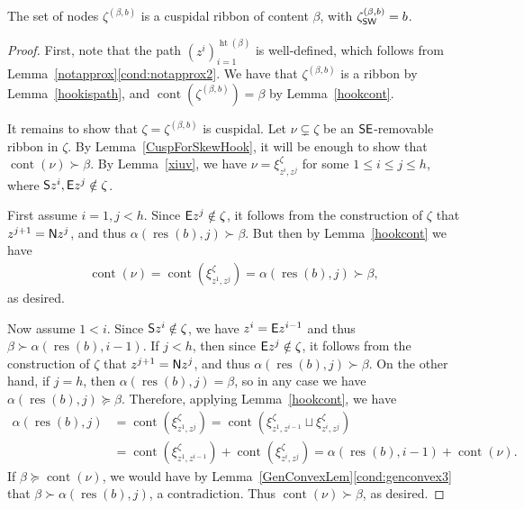 \documentclass[Unicode,ALCO]{cedram}
\newcommand{\res}{\operatorname{res}}
\newcommand{\height}{\operatorname{ht}}
\newcommand{\0}{{\bar 0}}
\newcommand{\so}{{\sf S}}
\newcommand{\no}{{\sf N}}
\newcommand{\ea}{{\sf E}}
\newcommand{\ssee}{{\sf SE}}
\newcommand{\ssww}{{\sf SW}}
\def\cont{{\operatorname{cont}}}
\def\height{{\operatorname{ht}}}
\def\height{{\operatorname{ht}}}
\begin{document}
\begin{lemma}\label{zetaiscusp}
The set of nodes  
\(\zeta^{(\beta,b)}\) is a cuspidal ribbon of content \(\beta\), with \(\zeta^{(\beta,b)}_{\ssww} = b\).
\end{lemma}
\begin{proof}
First, note that the path \((z^i)_{i=1}^{\height(\beta)}\) is well-defined, which follows from Lemma~\ref{notapprox}\eqref{cond:notapprox2}. We have that \(\zeta^{(\beta,b)}\) is a ribbon by Lemma~\ref{hookispath}, and \(\cont(\zeta^{(\beta,b)}) = \beta\) by Lemma~\ref{hookcont}.

It remains to show that \( \zeta = \zeta^{(\beta,b)}\) is cuspidal. Let \(\nu \subsetneq \zeta\) be an \(\ssee\)-removable ribbon in \(\zeta\). By Lemma~\ref{CuspForSkewHook}, it will be enough to show that \(\cont(\nu) \succ \beta\). By Lemma~\ref{xiuv}, we have 
\(\nu = \xi^\zeta_{z^i,z^j}\) for some \(1 \leq i \leq j \leq h\), where \(\so z^i, \ea z^j \notin \zeta\). 


First assume \(i=1, j<h\). Since \(\ea z^j  \notin \zeta\), it follows from the construction of \(\zeta\) that \(z^{j+1} = \no z^j\), and thus \(\alpha(\res(b),j) \succ \beta\). But then by Lemma~\ref{hookcont} we have 
\begin{align*}
\cont(\nu) = \cont(\xi^\zeta_{z^1, z^j}) =  \alpha(\res(b),j) \succ \beta,
\end{align*}
as desired.

Now assume \(1<i\). Since \(\so z^i \notin \zeta\), we have \(z^i = \ea z^{i-1} \) and thus \(\beta \succ \alpha(\res(b), i-1)\). If \(j<h\), then since \(\ea z^j  \notin \zeta\), it follows from the construction of \(\zeta\) that \(z^{j+1} = \no z^j\), and thus \(\alpha(\res(b),j) \succ \beta\). On the other hand, if \(j=h\), then \(\alpha(\res(b),j) = \beta\), so in any case we have \(\alpha(\res(b),j) \succeq \beta\).
Therefore, applying Lemma~\ref{hookcont}, we have
\begin{align*}
\alpha(\res(b), j) &= 
\cont(\xi^\zeta_{z^1, z^j}) 
=\cont(\xi^\zeta_{z^1, z^{i-1}}\sqcup \xi^\zeta_{z^i, z^j})\\
&=
\cont(\xi^\zeta_{z^1, z^{i-1}}) + \cont(\xi^\zeta_{z^i, z^j})
= \alpha(\res(b), i-1) + \cont(\nu).
\end{align*}
If \(\beta \succeq \cont(\nu)\), we would have by Lemma~\ref{GenConvexLem}\eqref{cond:genconvex3} that \(\beta \succ \alpha(\res(b), j)\), a contradiction. Thus \(\cont(\nu) \succ \beta\), as desired.
\end{proof}
\end{document}
